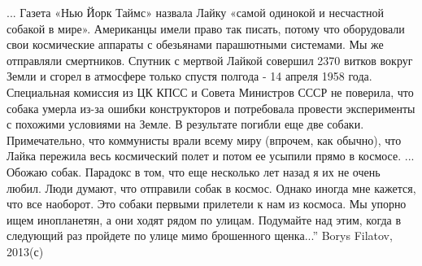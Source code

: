 ...
Газета «Нью Йорк Таймс» назвала Лайку «самой одинокой и несчастной собакой в мире». Американцы имели право так писать, потому что оборудовали свои космические аппараты с обезьянами парашютными системами. Мы же отправляли смертников.
Спутник с мертвой Лайкой совершил 2370 витков вокруг Земли и сгорел в атмосфере только спустя полгода - 14 апреля 1958 года.
Специальная комиссия из ЦК КПСС и Совета Министров СССР не поверила, что собака умерла из-за ошибки конструкторов и потребовала провести эксперименты с похожими условиями на Земле. 
В результате погибли еще две собаки.
Примечательно, что коммунисты врали всему миру (впрочем, как обычно), что Лайка пережила весь космический полет и потом ее усыпили прямо в космосе.
...
Обожаю собак. Парадокс в том, что еще несколько лет назад я их не очень любил.
Люди думают, что отправили собак в космос. Однако иногда мне кажется, что все наоборот. Это собаки первыми прилетели к нам из космоса. Мы упорно ищем инопланетян, а они ходят рядом по улицам.
Подумайте над этим, когда в следующий раз пройдете по улице мимо брошенного щенка...”
Borys Filatov, 2013(с)
\restorecr
